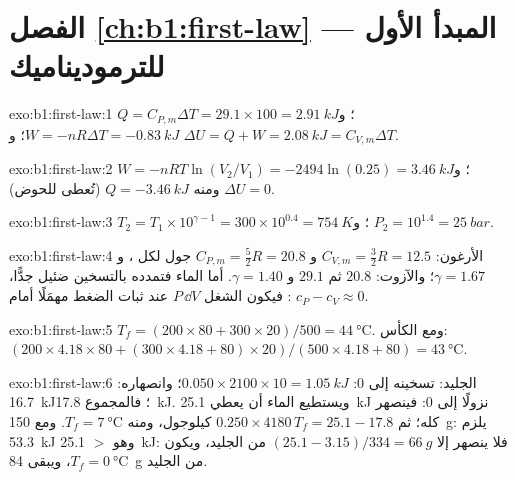 \section*{الفصل \ref{ch:b1:first-law} --- المبدأ الأول للترموديناميك}

\begin{solution}{exo:b1:first-law:1}
$Q = C_{P,m}\Delta T = 29.1 \times 100 = \qty{2.91}{kJ}$؛ و $W = -nR\Delta T =
\qty{-0.83}{kJ}$؛ و $\Delta U = Q + W = \qty{2.08}{kJ} = C_{V,m}\Delta T$.
\end{solution}

\begin{solution}{exo:b1:first-law:2}
$W = -nRT\ln(V_2/V_1) = -2494\ln(0.25) = \qty{+3.46}{kJ}$؛ و $\Delta U = 0$ ومنه
$Q = \qty{-3.46}{kJ}$ (تُعطى للحوض).
\end{solution}

\begin{solution}{exo:b1:first-law:3}
$T_2 = T_1 \times 10^{\gamma - 1} = 300 \times 10^{0.4} = \qty{754}{K}$؛ و $P_2 =
10^{1.4} = \qty{25}{bar}$.
\end{solution}

\begin{solution}{exo:b1:first-law:4}
الأرغون: $C_{V,m} = \tfrac32 R = 12.5$ و $C_{P,m} = \tfrac52 R = 20.8$ جول لكل  ،
و $\gamma = 1.67$؛ والآزوت: $20.8$ ثم $29.1$ و $\gamma = 1.40$. أما الماء فتمدده
بالتسخين ضئيل جدًّا، فيكون الشغل $P\,\dd V$ عند ثبات الضغط
مهمَلًا أمام : $c_P - c_V \approx 0$.
\end{solution}

\begin{solution}{exo:b1:first-law:5}
$T_f = (200 \times 80 + 300 \times 20)/500 = \qty{44}{\degreeCelsius}$. ومع
الكأس: $(200 \times 4.18 \times 80 + (300 \times 4.18 + 80) \times 20)/(500 \times
4.18 + 80) = \qty{43}{\degreeCelsius}$.
\end{solution}

\begin{solution}{exo:b1:first-law:6}
الجليد: تسخينه إلى $0$: $0.050 \times 2100 \times 10 = \qty{1.05}{kJ}$؛ وانصهاره:
\qty{16.7}{kJ}؛ فالمجموع \qty{17.8}{kJ}. ويستطيع الماء أن يعطي \qty{25.1}{kJ} نزولًا إلى
$0$: فينصهر كله؛ ثم $0.250 \times 4180\,T_f = 25.1 - 17.8$ كيلوجول، ومنه $T_f =
\qty{7}{\degreeCelsius}$. ومع \qty{150}{g}: يلزم \qty{53.3}{kJ} وهو $>$ \qty{25.1}{kJ}:
فلا ينصهر إلا $(25.1 - 3.15)/334 = \qty{66}{g}$ من الجليد، ويكون $T_f = \qty{0}{\degreeCelsius}$،
ويبقى \qty{84}{g} من الجليد.
\end{solution}

